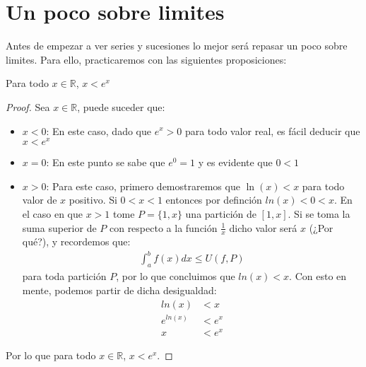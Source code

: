 \documentclass[12pt,a4paper,oneside]{memoir}
\begin{document}
\section*{Un poco sobre limites}
Antes de empezar a ver series y sucesiones lo mejor será repasar un poco sobre limites. Para ello, practicaremos con las siguientes proposiciones:
\begin{lemma}
    Para todo $x \in \mathbb{R}$, $x < e^{x}$
\end{lemma}
\begin{proof}
    Sea $x \in \mathbb{R}$, puede suceder que:
    \begin{itemize}
        \item $x < 0$: En este caso, dado que $e^{x} > 0$ para todo valor real, es fácil deducir que $x < e^{x}$
        \item $x = 0$: En este punto se sabe que $e^{0} = 1$ y es evidente que $0 < 1$
        \item $x > 0$: Para este caso, primero demostraremos que $\ln(x) < x$ para todo valor de $x$ positivo. Si $0 < x < 1$ entonces por definción $ln(x) < 0 < x$. En el caso en que $x > 1$ tome $P = \{1, x\}$ una partición de $[1, x]$. Si se toma la suma superior de $P$ con respecto a la función $\frac{1}{x}$ dicho valor será $x$ (¿Por qué?), y recordemos que:
        \begin{align*}
            \int_{a}^b f(x) dx \le U(f, P)
        \end{align*}
        para toda partición $P$, por lo que concluimos que $ln(x) < x$. Con esto en mente, podemos partir de dicha desigualdad:
        \begin{align*}
            ln(x) &< x\\
            e^{ln(x)} &< e^{x}\\
            x &< e^{x}
        \end{align*}
    \end{itemize}
    Por lo que para todo $x \in \mathbb{R}$, $x < e^{x}$.
\end{proof}
\end{document}
